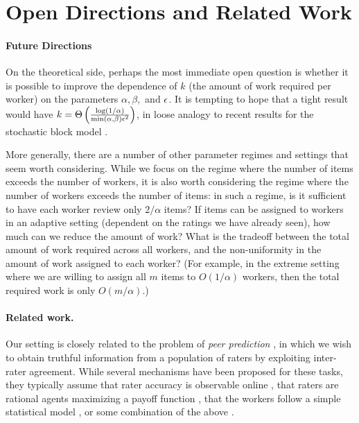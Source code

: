 \section{Open Directions and Related Work}
\label{sec:discussion}
\iffalse
\todo{fill in with lower bounds and conjectures that explain what 
``best possible'' result would look like, and how adversarial and 
stochastic settings compare}\fi

\paragraph{Future Directions}
On the theoretical side, perhaps the most immediate open question is whether it is 
possible to improve the dependence of $k$ (the amount of work required per worker) 
on the parameters $\alpha, \beta,$ and $\epsilon$.  It is tempting to hope that 
a tight result would have 
$k = \Theta\left( \frac{\log(1/\alpha)}{\min (\alpha,\beta)\epsilon^2} \right)$, in loose analogy
to recent results for the stochastic block model \citep{banks2016information}.


More generally, there are a number of other parameter regimes and settings that seem worth considering.  While we focus on the regime where the number of items exceeds the number of workers, it is also worth considering the regime where the number of workers exceeds the number of items:  in such a regime, is it sufficient to have each worker review only $2/\alpha$ items?  If items can be assigned to workers in an adaptive setting (dependent on the ratings we have already seen), how much can we reduce the amount of work?  What is the tradeoff between the total amount of work required across all workers, and the non-uniformity in the amount of work assigned to each worker?  (For example, in the extreme setting where we  are willing to assign all $m$ items to $O(1/\alpha)$ workers, then the total required work is only $O(m/\alpha)$.)



\paragraph{Related work.}
Our setting is closely related to the problem of \emph{peer prediction} 
\citep{miller2005eliciting}, in which we wish to obtain truthful information 
from a population of raters by exploiting inter-rater agreement. 
While several mechanisms have been proposed for these tasks, 
they typically assume that rater accuracy is observable online
\citep{resnick2007influence}, that raters are 
rational agents maximizing a payoff function \citep{dasgupta2013crowdsourced,
kamble2015truth,shnayder2016strong}, that the workers follow a simple 
statistical model \citep{karger2014budget,zhang2014crowdsourcing,
zhou2015regularized}, or some combination of the above \citep{shah2015double,
shah2015approval}. 

